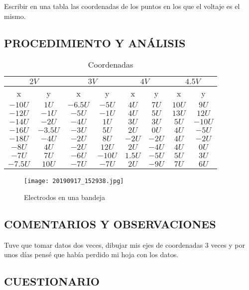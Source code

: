 \documentclass[10pt, twoside]{article}
\begin{document}
Escribir en una tabla las coordenadas de los puntos en los que
el voltaje es el mismo.

\subsection{PROCEDIMIENTO Y ANÁLISIS}%

\begin{table}[H]
	\centering
	\caption{Coordenadas}
	\label{tab:coordenadas}
	\begin{tabular}{c|c||c|c||c|c||c|c}
		\multicolumn{2}{c||}{$2V$}
		&\multicolumn{2}{c||}{$3V$}
		&\multicolumn{2}{c||}{$4V$}
		&\multicolumn{2}{c}{$4.5V$}\\
		\hline
		\hline
		x & y & x & y & x & y & x & y\\
		\hline
		$-10U$ & $1U$ & $-6.5U$ & $-5U$ & $4U$ & $7U$ & $10U$ & $9U$\\
		\hline
		$-12U$ & $-1U$ & $-5U$ & $-1U$ & $4U$ & $5U$ & $13U$ & $12U$\\
		\hline
		$-14U$ & $-2U$ & $-4U$ & $1U$ & $3U$ & $3U$ & $5U$ & $-10U$\\
		\hline
		$-16U$ & $-3.5U$ & $-3U$ & $5U$ & $2U$ & $0U$ & $4U$ & $-5U$\\
		\hline
		$-18U$ & $-4U$ & $-2U$ & $8U$ & $-2U$ & $-2U$ & $4U$ & $-2U$\\
		\hline
		$-8U$ & $4U$ & $-2U$ & $12U$ & $2U$ & $-4U$ & $4U$ & $0U$\\
		\hline
		$-7U$ & $7U$ & $-6U$ & $-10U$ & $1.5U$ & $-5U$ & $5U$ & $3U$\\
		\hline
		$-7.5U$ & $10U$ & $-7U$ & $-7U$ & $2U$ & $-9U$ & $7U$ & $6U$\\
		\hline
	\end{tabular}
\end{table}

\begin{figure}[H]
	\centering
	\texttt{[image: 20190917\_152938.jpg]}
	\caption{Electrodos en una bandeja}%
	\label{fig:bandeja}
\end{figure}

\subsection{COMENTARIOS Y OBSERVACIONES}%

Tuve que tomar datos dos veces,
dibujar mis ejes de coordenadas 3 veces
y por unos días pensé que había perdido mi hoja con los datos.

\subsection{CUESTIONARIO}%
\end{document}

